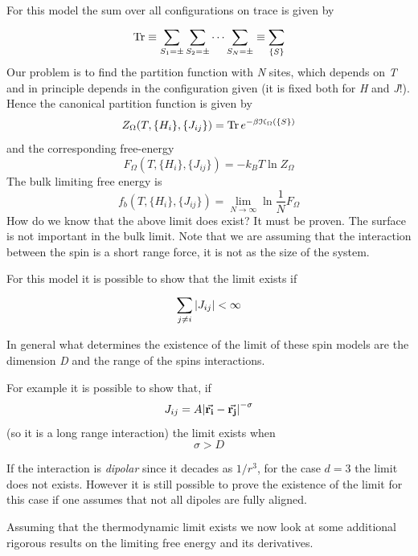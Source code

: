 \documentclass[../main/main.tex]{subfiles}
\begin{document}
For this model the sum over all configurations on trace is given by
\begin{equation}
  \Tr \equiv \sum_{S_1 = \pm }^{}  \sum_{S_2 = \pm }^{}  \dots \sum_{S_N = \pm }^{} \equiv \sum_{\{ S \}  }^{}
\end{equation}
 Our problem is to find the partition function with \emph{N} sites, which depends on \emph{T} and in principle depends in the configuration given (it is fixed both for \emph{H} and \emph{J}!).
Hence the canonical partition function is given by
\begin{equation}
  Z_{\Omega } (T, \{ H_i \}, \{ J_{ij} \}    ) = \Tr e^{-\beta \mathcal{H}_ \Omega ( \{ S \}  )}
\end{equation}
and the corresponding free-energy
\begin{equation}
  F_ \Omega  (T, \{ H_i \}, \{ J_{ij} \} ) = - k_B T \ln{Z_ \Omega }
\end{equation}
The bulk limiting free energy is
\begin{equation}
  f_b (T, \{ H_i \}, \{ J_{ij} \} ) = \lim_{N \rightarrow \infty } \ln {\frac{1}{N} F_ \Omega  }
\end{equation}
How do we know that the above limit does exist? It must be proven. The surface is not important in the bulk limit.
 Note that we are assuming that the interaction between the spin is a short range force, it is not as the size of the system.

For this model it is possible to show that the limit exists if
\begin{equation}
  \sum_{j \neq i}^{} \abs{J_{ij}} < \infty
\end{equation}
\begin{remark}
In general what determines the existence of the limit of these spin models are the dimension \emph{D} and the range of the spins interactions.
\end{remark}
For example it is possible to show that, if
\begin{equation}
  J_{ij} = A \abs{\va{r_i}-\va{r_j}  }^{-\sigma}
\end{equation}
(so it is a long range interaction)
the limit exists when
\begin{equation}
  \sigma > D
\end{equation}
\begin{remark}
If the interaction is \emph{dipolar} since it decades as \( 1/r^3 \), for the case \( d=3 \) the limit does not exists. However it is still possible to prove the existence of the limit for this case if one assumes that not all dipoles are fully aligned.
\end{remark}
Assuming that the thermodynamic limit exists we now look at some additional rigorous results on the limiting free energy and its derivatives.
\end{document}
